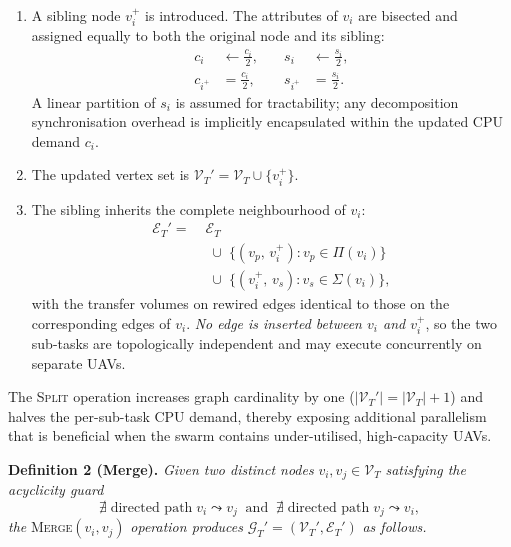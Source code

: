\begin{enumerate}[label=(\roman*), leftmargin=*, itemsep=2pt]
  \item A sibling node $v_i^{+}$ is introduced.
        The attributes of $v_i$ are bisected and assigned equally to
        both the original node and its sibling:
        \begin{equation}
          \begin{aligned}
            c_i &\leftarrow \tfrac{c_i}{2}, &\quad
            s_i &\leftarrow \tfrac{s_i}{2},\\
            c_{i^{+}} &= \tfrac{c_i}{2}, &\quad
            s_{i^{+}} &= \tfrac{s_i}{2}.
          \end{aligned}
          \label{eq:split_attr}
        \end{equation}
        A linear partition of $s_i$ is assumed for tractability;
        any decomposition synchronisation overhead is implicitly
        encapsulated within the updated CPU demand $c_i$.

  \item The updated vertex set is
        $\mathcal{V}_T' = \mathcal{V}_T \cup \{v_i^{+}\}$.

  \item The sibling inherits the complete neighbourhood of $v_i$:
        \begin{align}
          \mathcal{E}_T' =\;& \mathcal{E}_T \nonumber\\
          &\;\cup\; \bigl\{(v_p,\, v_i^{+}) : v_p \in \Pi(v_i)\bigr\}
          \nonumber\\
          &\;\cup\; \bigl\{(v_i^{+},\, v_s) : v_s \in \Sigma(v_i)\bigr\},
          \label{eq:split_edges}
        \end{align}
        with the transfer volumes on rewired edges identical to those
        on the corresponding edges of $v_i$.
        \emph{No edge is inserted between $v_i$ and $v_i^{+}$},
        so the two sub-tasks are topologically independent and may
        execute concurrently on separate UAVs.
\end{enumerate}

The \textsc{Split} operation increases graph cardinality by one
($|\mathcal{V}_T'| = |\mathcal{V}_T| + 1$) and halves the per-sub-task
CPU demand, thereby exposing additional parallelism that is beneficial
when the swarm contains under-utilised, high-capacity UAVs.

\smallskip
\noindent\textbf{Definition 2 (Merge).}
\emph{Given two distinct nodes} $v_i, v_j \in \mathcal{V}_T$
\emph{satisfying the acyclicity guard}
\begin{equation}
  \nexists\;\text{directed path}\;v_i \leadsto v_j
  \;\;\text{and}\;\;
  \nexists\;\text{directed path}\;v_j \leadsto v_i,
  \label{eq:cycle_guard}
\end{equation}
\emph{the} \textsc{Merge}$(v_i, v_j)$
\emph{operation produces}
$\mathcal{G}_T' = (\mathcal{V}_T', \mathcal{E}_T')$
\emph{as follows.}

